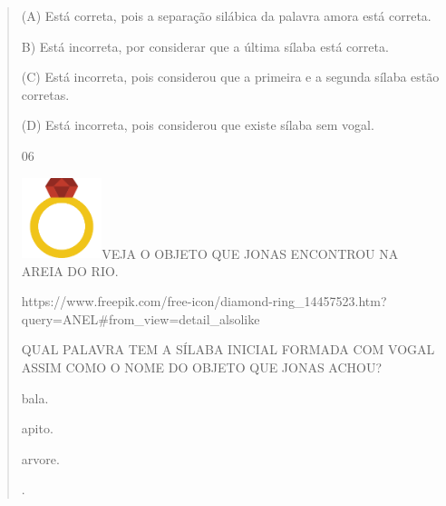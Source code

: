 \begin{verse}
{{{{{{{{{{{{{{{{{(A) Está correta, pois a separação silábica da palavra amora está
correta.

B) Está incorreta, por considerar que a última sílaba está correta.

(C) Está incorreta, pois considerou que a primeira e a segunda sílaba
estão corretas.

(D) Está incorreta, pois considerou que existe sílaba sem vogal.

\num{06}

\includegraphics[width=0.92222in,height=0.92222in]{media/image151.png}VEJA
O OBJETO QUE JONAS ENCONTROU NA AREIA DO RIO.

https://www.freepik.com/free-icon/diamond-ring\_14457523.htm?query=ANEL\#from\_view=detail\_alsolike

QUAL PALAVRA TEM A SÍLABA INICIAL FORMADA COM VOGAL ASSIM COMO O NOME DO
OBJETO QUE JONAS ACHOU?

\begin{escolha}
\item bala.

\item apito.

\item arvore.

\itempanela.
\end{escolha}

}}}}}}}}}}}}}}}}}
\end{verse}
